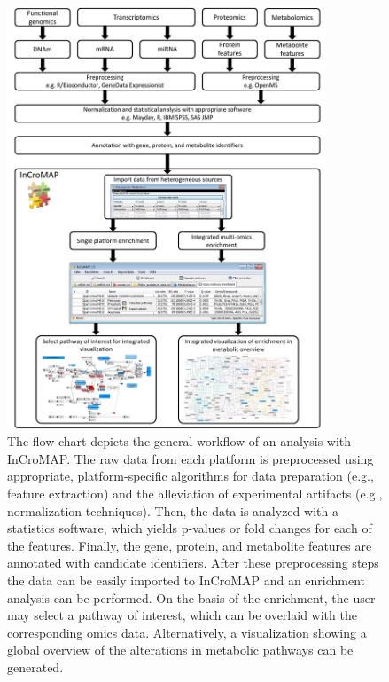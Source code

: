 \documentclass[final,5p,times,twocolumn]{elsarticle}
\begin{document}
\begin{figure}
\center
\includegraphics[width=0.85\textwidth]{InCroMAP_workflow.pdf}
\caption{The flow chart depicts the general workflow of an analysis with InCroMAP. The raw data from each platform is preprocessed using appropriate, platform-specific algorithms for data preparation (e.g., feature extraction) and the alleviation of experimental artifacts (e.g., normalization techniques). Then, the data is analyzed with a statistics software, which yields p-values or fold changes for each of the features. Finally, the gene, protein, and metabolite features are annotated with candidate identifiers. After these preprocessing steps the data can be easily imported to InCroMAP and an enrichment analysis can be performed. On the basis of the enrichment, the user may select a pathway of interest, which can be overlaid with the corresponding omics data. Alternatively, a visualization showing a global overview of the alterations in metabolic pathways can be generated.}
\label{fig:incromap-workflow}
\end{figure}
\end{document}
